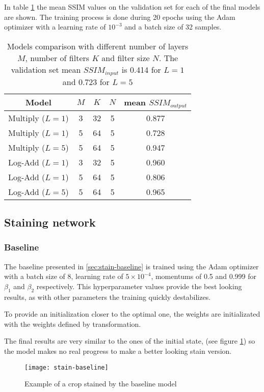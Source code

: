 \documentclass[../main.tex]{subfiles}
\begin{document}
In table \ref{tab:despeckling} the mean SSIM values on the validation set
for each of the final models are shown. The training process is done during
20 epochs using the Adam optimizer with a learning rate of $10^{-3}$ and a
batch size of 32 samples.

\begin{table}
\centering
\begin{tabular}{*5c}
\toprule
Model & $M$ & $K$ & $N$ & mean $SSIM_{output}$ \\
\midrule
Multiply ($L = 1$) & 3 & 32 & 5 & 0.877 \\
Multiply ($L = 1$) & 5 & 64 & 5 & 0.728 \\
Multiply ($L = 5$) & 5 & 64 & 5 & 0.947 \\
Log-Add ($L = 1$) & 3 & 32 & 5 & 0.960 \\
Log-Add ($L = 1$) & 5 & 64 & 5 & 0.806 \\
Log-Add ($L = 5$) & 5 & 64 & 5 & 0.965 \\
\bottomrule
\end{tabular}
\caption{Models comparison with different number of layers $M$, number
of filters $K$ and filter size $N$. The validation set mean $SSIM_{input}$
is 0.414 for $L=1$ and 0.723 for $L=5$}
\label{tab:despeckling}
\end{table}

\subsection{Staining network}
\subsubsection{Baseline}
The baseline presented in \ref{sec:stain-baseline} is trained using the
Adam optimizer
with a batch size of 8, learning rate of $5 \times 10^{-4}$, momentums of
0.5 and 0.999 for $\beta_1$ and $\beta_2$ respectively. This hyperparameter
values provide the best looking results, as with other parameters the training
quickly destabilizes.

To provide an initialization closer to the optimal one, the weights are
initializated with the weights defined by \cite{Gareau2009} transformation.

The final results are very similar to the ones of the initial state,
(see figure \ref{fig:stain-baseline})
so the model makes no real progress to make a better looking stain version.

\begin{figure}
\centering
\texttt{[image: stain-baseline]}
\caption{Example of a crop stained by the baseline model}
\label{fig:stain-baseline}
\end{figure}
\end{document}
